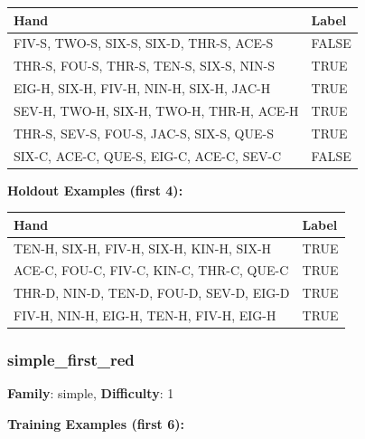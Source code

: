 \documentclass[10pt,a4paper]{article}
\begin{document}
\begin{small}
\begin{tabular}{p{8cm}l}
\toprule
Hand & Label \\
\midrule
FIV-S, TWO-S, SIX-S, SIX-D, THR-S, ACE-S & \textcolor{negative}{FALSE} \\
THR-S, FOU-S, THR-S, TEN-S, SIX-S, NIN-S & \textcolor{positive}{TRUE} \\
EIG-H, SIX-H, FIV-H, NIN-H, SIX-H, JAC-H & \textcolor{positive}{TRUE} \\
SEV-H, TWO-H, SIX-H, TWO-H, THR-H, ACE-H & \textcolor{positive}{TRUE} \\
THR-S, SEV-S, FOU-S, JAC-S, SIX-S, QUE-S & \textcolor{positive}{TRUE} \\
SIX-C, ACE-C, QUE-S, EIG-C, ACE-C, SEV-C & \textcolor{negative}{FALSE} \\
\bottomrule
\end{tabular}
\end{small}

\textbf{Holdout Examples (first 4):}

\begin{small}
\begin{tabular}{p{8cm}l}
\toprule
Hand & Label \\
\midrule
TEN-H, SIX-H, FIV-H, SIX-H, KIN-H, SIX-H & \textcolor{positive}{TRUE} \\
ACE-C, FOU-C, FIV-C, KIN-C, THR-C, QUE-C & \textcolor{positive}{TRUE} \\
THR-D, NIN-D, TEN-D, FOU-D, SEV-D, EIG-D & \textcolor{positive}{TRUE} \\
FIV-H, NIN-H, EIG-H, TEN-H, FIV-H, EIG-H & \textcolor{positive}{TRUE} \\
\bottomrule
\end{tabular}
\end{small}

\vspace{0.5cm}

\subsubsection{simple\_first\_red}

\textbf{Family}: simple, \textbf{Difficulty}: 1

\textbf{Training Examples (first 6):}
\end{document}
